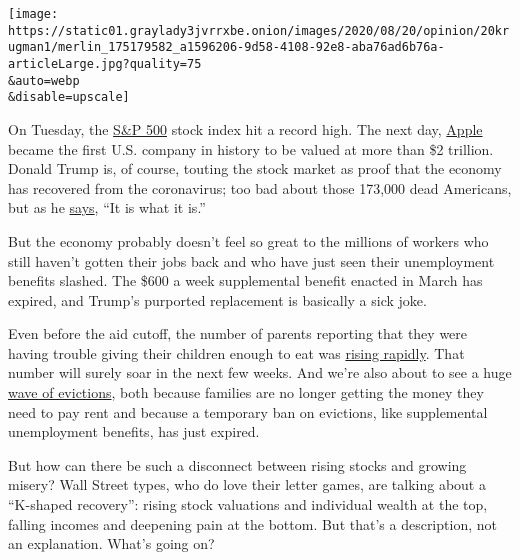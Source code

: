 \texttt{[image: https://static01.graylady3jvrrxbe.onion/images/2020/08/20/opinion/20krugman1/merlin\_175179582\_a1596206-9d58-4108-92e8-aba76ad6b76a-articleLarge.jpg?quality=75\\\&auto=webp\\\&disable=upscale]}

On Tuesday, the \href{https://www.cnbc.com/quotes/?symbol=.SPX}{S\&P
500} stock index hit a record high. The next day,
\href{https://www.nytimes3xbfgragh.onion/2020/08/19/technology/apple-2-trillion.html\#:~:text=Apple\%20surpasses\%20\%242\%20trillion\%2C\%20doubling\%20its\%20value\%20in\%20only\%20two\%20years.\&text=Apple\%20reaches\%20\%241\%20trillion\%20in,42\%20years\%20after\%20its\%20founding.\&text=I.P.O.\&text=Apple\%20surpasses\%20\%242\%20trillion\%2C\%20doubling\%20its\%20value\%20in\%20only\%20two\%20years.,-trillion}{Apple}
became the first U.S. company in history to be valued at more than \$2
trillion. Donald Trump is, of course, touting the stock market as proof
that the economy has recovered from the coronavirus; too bad about those
173,000 dead Americans, but as he
\href{https://www.nytimes3xbfgragh.onion/aponline/2020/08/19/us/politics/ap-us-election-2020-dnc-trump-remark.html}{says},
``It is what it is.''

But the economy probably doesn't feel so great to the millions of
workers who still haven't gotten their jobs back and who have just seen
their unemployment benefits slashed. The \$600 a week supplemental
benefit enacted in March has expired, and Trump's purported replacement
is basically a sick joke.

Even before the aid cutoff, the number of parents reporting that they
were having trouble giving their children enough to eat was
\href{https://www.wsj.com/articles/more-americans-go-hungry-amid-coronavirus-pandemic-census-shows-11597570200}{rising
rapidly}. That number will surely soar in the next few weeks. And we're
also about to see a huge
\href{https://www.nytimes3xbfgragh.onion/2020/08/07/business/economy/housing-economy-eviction-renters.html}{wave
of evictions}, both because families are no longer getting the money
they need to pay rent and because a temporary ban on evictions, like
supplemental unemployment benefits, has just expired.

But how can there be such a disconnect between rising stocks and growing
misery? Wall Street types, who do love their letter games, are talking
about a ``K-shaped recovery'': rising stock valuations and individual
wealth at the top, falling incomes and deepening pain at the bottom. But
that's a description, not an explanation. What's going on?

